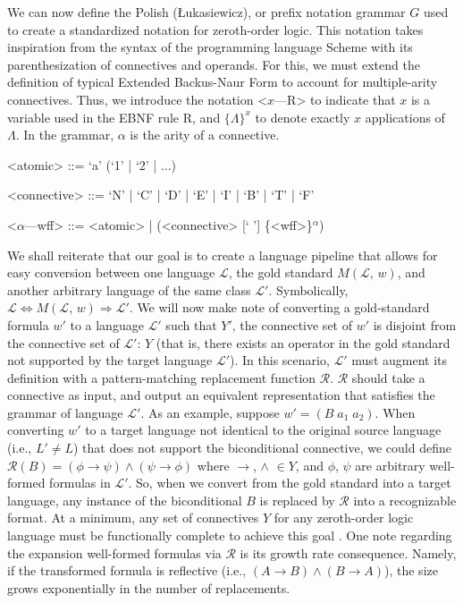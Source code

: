 \documentclass[ms]{uncgdissertationexp2}
\theoremstyle{plain}
\theoremstyle{definition}
\theoremstyle{remark}
\begin{document}
We can now define the Polish (Łukasiewicz), or prefix notation grammar $G$ used to create a standardized notation for zeroth-order logic. This notation takes inspiration from the syntax of the programming language Scheme with its parenthesization of connectives and operands. For this, we must extend the definition of typical Extended Backus-Naur Form to account for multiple-arity connectives. Thus, we introduce the notation \textless{$x$---R\textgreater} to indicate that $x$ is a variable used in the EBNF rule R, and $\{\Lambda\}^{x}$ to denote exactly $x$ applications of $\Lambda$. In the grammar, $\alpha$ is the arity of a connective.
\begin{grammar}
	<atomic> ::= `a' (`1' | `2' | ...)
	        
	<connective> ::= `N' | `C' | `D' | `E' | `I' | `B' | `T' | `F' 
	        
	<$\alpha$---wff> ::= <atomic> | (<connective> [` '] \{<wff>\}$^{\alpha}$)
\end{grammar}

We shall reiterate that our goal is to create a language pipeline that allows for easy conversion between one language $\mathcal{L}$, the gold standard $M(\mathcal{L},\, w)$, and another arbitrary language of the same class $\mathcal{L}'$. Symbolically, $\mathcal{L} \Leftrightarrow M(\mathcal{L},\,w) \Rightarrow \mathcal{L'}$. We will now make note of converting a gold-standard formula $w'$ to a language $\mathcal{L'}$ such that $Y'$, the connective set of $w'$ is disjoint from the connective set of $\mathcal{L}'$: $Y$ (that is, there exists an operator in the gold standard not supported by the target language $\mathcal{L}'$). In this scenario, $\mathcal{L}'$ must augment its definition with a pattern-matching replacement function $\mathcal{R}$. $\mathcal{R}$ should take a connective as input, and output an equivalent representation that satisfies the grammar of language $\mathcal{L}'$. As an example, suppose $w' = (B\;a_1\;a_2)$. When converting $w'$ to a target language not identical to the original source language (i.e., $L' \neq L$) that does not support the biconditional connective, we could define $\mathcal{R}(B) = (\phi \to \psi) \land (\psi \to \phi)$ where $\to$, $\land$ $\in Y$, and $\phi$, $\psi$ are arbitrary well-formed formulas in $\mathcal{L}'$. So, when we convert from the gold standard into a target language, any instance of the biconditional $B$ is replaced by $\mathcal{R}$ into a recognizable format. At a minimum, any set of connectives $Y$ for any zeroth-order logic language must be functionally complete to achieve this goal \cite{post}. One note regarding the expansion well-formed formulas via $\mathcal{R}$ is its growth rate consequence. Namely, if the transformed formula is reflective (i.e., $(A \to B) \land (B \to A)$), the size grows exponentially in the number of replacements. 
\end{document}
